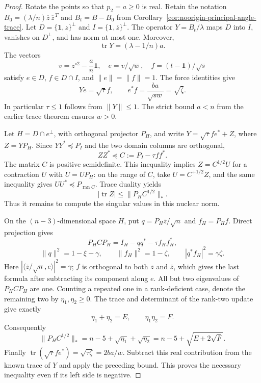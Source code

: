 \documentclass[11pt]{article}
\theoremstyle{remark}
\numberwithin{equation}{section}
\begin{document}
\begin{proof}
Rotate the points so that $p_2=a\ge0$ is real. Retain the notation
$B_0=(\lambda/n)\overline z\,\overline z^{\,T}$ and
$B_t=B-B_0$ from Corollary~\ref{cor:noorigin-principal-angle-trace}.
Let $D=\{\mathbf1,z\}^{\perp}$ and
$I=\{\mathbf1,\overline z\}^{\perp}$.
The operator $Y=B_t/\lambda$ maps $D$ into $I$, vanishes on
$D^\perp$, and has norm at most one. Moreover,
\[
                 \operatorname{tr}Y=(\lambda-1/n)a.
\]
The vectors
\[
 v=z^{\circ2}-\frac a n\mathbf1,\quad e=v/\sqrt w,\quad
 f=(t-\mathbf1)/\sqrt s
\]
satisfy $e\in D$, $f\in D\cap I$, and $\|e\|=\|f\|=1$.
The force identities give
\[
 Ye=\sqrt\tau f,\qquad
 e^*f=\frac{ba}{\sqrt{sw}}=\sqrt\zeta .
\]
In particular $\tau\le1$ follows from $\|Y\|\le1$.
The strict bound $a<n$ from the earlier trace theorem ensures $w>0$.

Let $H=D\cap e^\perp$, with orthogonal projector $P_H$, and write
$Y=\sqrt\tau f e^*+Z$, where $Z=YP_H$.
Since $YY^*\preceq P_I$ and the two domain columns are orthogonal,
\[
                ZZ^*\preceq C:=P_I-\tau ff^* .
\]
The matrix $C$ is positive semidefinite. This inequality implies
$Z=C^{1/2}U$ for a contraction $U$ with $U=UP_H$:
on the range of $C$, take $U=C^{+1/2}Z$, and the same inequality
gives $UU^*\preceq P_{\operatorname{ran}C}$. Trace duality yields
\[
 |\operatorname{tr}Z|
     \le\|P_H C^{1/2}\|_*.
\]
Thus it remains to compute the singular values in this nuclear norm.

On the $(n-3)$-dimensional space $H$, put
$q=P_H\overline z/\sqrt n$ and $f_H=P_Hf$. Direct projection gives
\[
 P_HCP_H=I_H-qq^*-\tau f_Hf_H^*,
\]
\[
 \|q\|^2=1-\xi-\gamma,\qquad
 \|f_H\|^2=1-\zeta,\qquad
 |q^*f_H|^2=\gamma\zeta .
\]
Here $|\langle\overline z/\sqrt n,e\rangle|^2=\gamma$;
$f$ is orthogonal to both $z$ and $\overline z$, which gives
the last formula after subtracting its component along $e$.
All but two eigenvalues of $P_HCP_H$ are one. Counting a repeated
one in a rank-deficient case, denote the remaining two by
$\eta_1,\eta_2\ge0$. The trace and determinant of the rank-two
update give exactly
\[
 \eta_1+\eta_2=E,\qquad \eta_1\eta_2=F .
\]
Consequently
\[
 \|P_H C^{1/2}\|_*
   =n-5+\sqrt{\eta_1}+\sqrt{\eta_2}
   =n-5+\sqrt{E+2\sqrt F}.
\]
Finally $\operatorname{tr}(\sqrt\tau f e^*)=
\sqrt{\tau\zeta}=2ba/w$. Subtract this real contribution from
the known trace of $Y$ and apply the preceding bound.
This proves the necessary inequality even if its left side is negative.
\end{proof}
\end{document}

